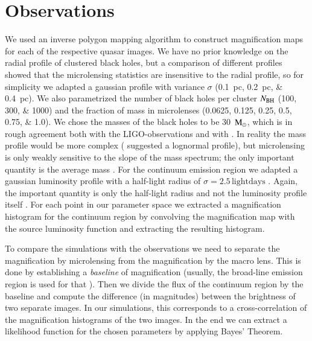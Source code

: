 \documentclass{aa}
\def\Msun{\ensuremath{\rm M_\odot}}
\begin{document}
\section{Observations}
We used an inverse polygon mapping algorithm \citep{2011ApJ...741...42M,2006ApJ...653..942M} to construct magnification maps for each of the respective quasar images. We have no prior knowledge on the radial profile of clustered black holes, but a comparison of different profiles showed that the microlensing statistics are insensitive to the radial profile, so for simplicity we adapted a gaussian profile with variance $\sigma$ (\SIlist{0.1;0.2;0.4}{pc}). We also parametrized the number of black holes per cluster $N_{\rm BH}$ (\numlist{100;300;1000}) and the fraction of mass in microlenses (\numlist{0.0625;0.125;0.25;0.5;0.75;1.0}). We chose the masses of the black holes to be \SI{30}{\Msun}, which is in rough agreement both with the LIGO-observations and with \citet{2017arXiv171004694G}. In reality the mass profile would be more complex (\citet{2017arXiv171004694G} suggested a lognormal profile), but microlensing is only weakly sensitive to the slope of the mass spectrum; the only important quantity is the average mass \citep{2007MNRAS.376..263C}. For the continuum emission region we adapted a gaussian luminosity profile with a half-light radius of $\sigma = 2.5\, \text{lightdays}$ \citep{2016ApJ...821...56F,2009ApJ...706.1451M}. Again, the important quantity is only the half-light radius and not the luminosity profile itself \citep{2005ApJ...628..594M}. For each point in our parameter space we extracted a magnification histogram for the continuum region by convolving the magnification map with the source luminosity function and extracting the resulting histogram.

To compare the simulations with the observations we need to separate the magnification by microlensing from the magnification by the macro lens. This is done by establishing a \emph{baseline} of magnification (usually, the broad-line emission region is used for that \citep{2009ApJ...706.1451M}). Then we divide the flux of the continuum region by the baseline and compute the difference (in magnitudes) between the brightness of two separate images. In our simulations, this corresponds to a cross-correlation of the magnification histograms of the two images. In the end we can extract a likelihood function for the chosen parameters by applying Bayes' Theorem.
\end{document}
